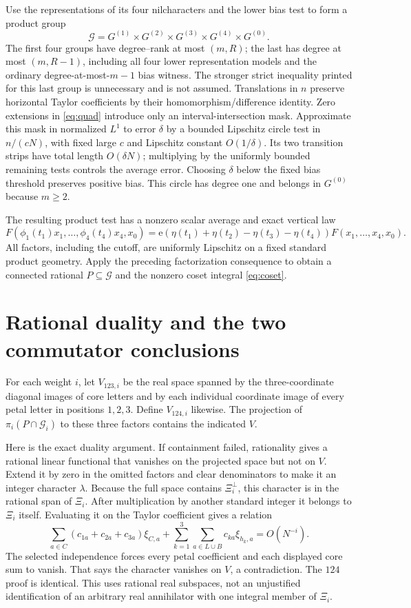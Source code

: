 \documentclass[11pt]{article}
\newcommand{\ee}{\mathrm e}\newcommand{\DR}{\mathrm{DR}}
\begin{document}
Use the representations of its four nilcharacters and the lower bias test
to form a product group
\[
 \mathcal G=G^{(1)}\times G^{(2)}\times G^{(3)}\times G^{(4)}\times G^{(0)}.
\]
The first four groups have degree--rank at most $(m,R)$; the last has degree
at most $(m,R-1)$, including all four lower representation models and the
ordinary degree-at-most-$m-1$ bias witness. The stronger strict inequality
printed for this last group is unnecessary and is not assumed.
Translations in $n$ preserve horizontal Taylor coefficients by their
homomorphism/difference identity. Zero extensions in \eqref{eq:quad}
introduce only an interval-intersection mask. Approximate this mask in
normalized $L^1$ to error $\delta$ by a bounded Lipschitz circle test in
$n/(cN)$, with fixed large $c$ and Lipschitz constant $O(1/\delta)$.
Its two transition strips have total length $O(\delta N)$; multiplying by
the uniformly bounded remaining tests controls the average error. Choosing
$\delta$ below the fixed bias threshold preserves positive bias. This circle
has degree one and belongs in $G^{(0)}$ because $m\geq2$.

The resulting product test has a nonzero scalar average and exact vertical law
\[
 F(\phi_1(t_1)x_1,\ldots,\phi_4(t_4)x_4,x_0)
 =\ee(\eta(t_1)+\eta(t_2)-\eta(t_3)-\eta(t_4))F(x_1,\ldots,x_4,x_0).
\]
All factors, including the cutoff, are uniformly Lipschitz on a fixed
standard product geometry. Apply the preceding factorization consequence
to obtain a connected rational $P\subseteq\mathcal G$ and the nonzero
coset integral \eqref{eq:coset}.

\section{Rational duality and the two commutator conclusions}
For each weight $i$, let $V_{123,i}$ be the real space spanned by the
three-coordinate diagonal images of core letters and by each individual
coordinate image of every petal letter in positions $1,2,3$. Define
$V_{124,i}$ likewise. The projection of $\pi_i(P\cap\mathcal G_i)$ to
these three factors contains the indicated $V$.

Here is the exact duality argument. If containment failed, rationality gives
a rational linear functional that vanishes on the projected space but not
on $V$. Extend it by zero in the omitted factors and clear denominators to
make it an integer character $\lambda$. Because the full space contains
$\Xi_i^\perp$, this character is in the rational span of $\Xi_i$. After
multiplication by another standard integer it belongs to $\Xi_i$ itself.
Evaluating it on the Taylor coefficient gives a relation
\[
 \sum_{a\in C}(c_{1a}+c_{2a}+c_{3a})\xi_{C,a}
       +\sum_{k=1}^3\sum_{a\in L\cup B}c_{ka}\xi_{h_k,a}
       =O(N^{-i}).
\]
The selected independence forces every petal coefficient and each displayed
core sum to vanish. That says the character vanishes on $V$, a contradiction.
The $124$ proof is identical. This uses rational real subspaces, not an
unjustified identification of an arbitrary real annihilator with one
integral member of $\Xi_i$.
\end{document}
